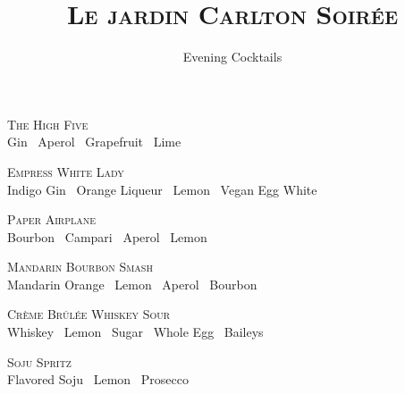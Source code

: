 \documentclass[12pt]{article}
\author{Evening Cocktails}
\begin{document}
\BgThispage

\title{\textsc{Le jardin Carlton Soirée}}
\date{}
\maketitle

\vspace{1.2cm}

\begin{center}
{\Large \textsc{The High Five}} \\
\vspace{0.2em}
{\monofont Gin \textperiodcentered\ Aperol \textperiodcentered\ Grapefruit \textperiodcentered\ Lime}
\end{center}

\vspace{1.2cm}

\begin{center}
{\Large \textsc{Empress White Lady}} \\
\vspace{0.2em}
{\monofont Indigo Gin \textperiodcentered\ Orange Liqueur \textperiodcentered\ Lemon \textperiodcentered\ Vegan Egg White}
\end{center}

\vspace{1.2cm}

\begin{center}
{\Large \textsc{Paper Airplane}} \\
\vspace{0.2em}
{\monofont Bourbon \textperiodcentered\ Campari \textperiodcentered\ Aperol \textperiodcentered\ Lemon}
\end{center}

\vspace{1.2cm}

\begin{center}
{\Large \textsc{Mandarin Bourbon Smash}} \\
\vspace{0.2em}
{\monofont Mandarin Orange \textperiodcentered\ Lemon \textperiodcentered\ Aperol \textperiodcentered\ Bourbon}
\end{center}

\vspace{1.2cm}

\begin{center}
{\Large \textsc{Crème Brûlée Whiskey Sour}} \\
\vspace{0.2em}
{\monofont Whiskey \textperiodcentered\ Lemon \textperiodcentered\ Sugar \textperiodcentered\ Whole Egg \textperiodcentered\ Baileys}
\end{center}

\vspace{1.2cm}

\begin{center}
{\Large \textsc{Soju Spritz}} \\
\vspace{0.2em}
{\monofont Flavored Soju \textperiodcentered\ Lemon \textperiodcentered\ Prosecco}
\end{center}
\end{document}
